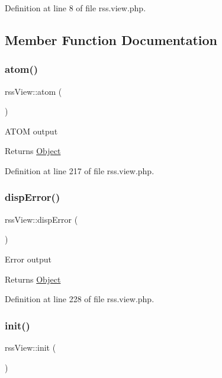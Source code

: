 Definition at line 8 of file rss.\+view.\+php.



\subsection{Member Function Documentation}
\mbox{\label{classrssView_a4c0453c52a946c2fe3643e099235eb62}} 
\subsubsection{\texorpdfstring{atom()}{atom()}}
{\footnotesize\ttfamily rss\+View\+::atom (\begin{DoxyParamCaption}{ }\end{DoxyParamCaption})}

A\+T\+OM output

\begin{DoxyReturn}{Returns}
\hyperlink{classObject}{Object} 
\end{DoxyReturn}


Definition at line 217 of file rss.\+view.\+php.

\mbox{\label{classrssView_a1e6808d03030aa6f6ff61083798c2422}} 
\subsubsection{\texorpdfstring{disp\+Error()}{dispError()}}
{\footnotesize\ttfamily rss\+View\+::disp\+Error (\begin{DoxyParamCaption}{ }\end{DoxyParamCaption})}

Error output

\begin{DoxyReturn}{Returns}
\hyperlink{classObject}{Object} 
\end{DoxyReturn}


Definition at line 228 of file rss.\+view.\+php.

\mbox{\label{classrssView_af438b469cdde5b47ced8ada179d56c4d}} 
\subsubsection{\texorpdfstring{init()}{init()}}
{\footnotesize\ttfamily rss\+View\+::init (\begin{DoxyParamCaption}{ }\end{DoxyParamCaption})}

